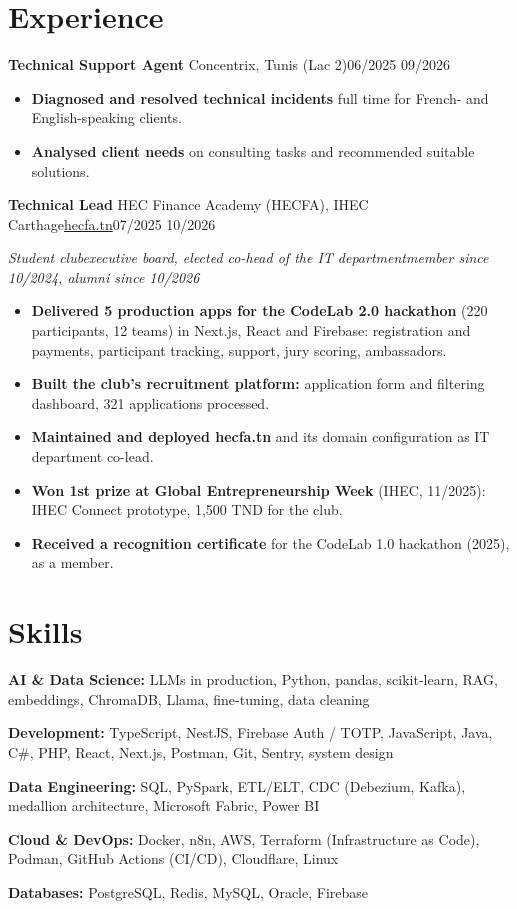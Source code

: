 \documentclass[10pt]{article}
\newcommand{\entry}[3]{\par\vspace{2pt}\textbf{#1}#2\hfill{\color{soft}#3}\par}
\newcommand{\sub}[1]{{\itshape\color{soft}#1\par}}
\newcommand{\sep}{\enspace\textperiodcentered\enspace}
\begin{document}
\section{Experience}
\entry{Technical Support Agent}{ \textendash{} Concentrix, Tunis (Lac 2)}{06/2025 \textendash{} 09/2026}
\begin{itemize}
\item \textbf{Diagnosed and resolved technical incidents} full time for French- and English-speaking clients.
\item \textbf{Analysed client needs} on consulting tasks and recommended suitable solutions.
\end{itemize}
\entry{Technical Lead}{ \textendash{} HEC Finance Academy (HECFA), IHEC Carthage\sep \href{https://hecfa.tn}{hecfa.tn}}{07/2025 \textendash{} 10/2026}
\sub{Student club\sep executive board, elected co-head of the IT department\sep member since 10/2024, alumni since 10/2026}
\begin{itemize}
\item \textbf{Delivered 5 production apps for the CodeLab 2.0 hackathon} (220 participants, 12 teams) in Next.js, React and Firebase: registration and payments, participant tracking, support, jury scoring, ambassadors.
\item \textbf{Built the club's recruitment platform:} application form and filtering dashboard, 321 applications processed.
\item \textbf{Maintained and deployed hecfa.tn} and its domain configuration as IT department co-lead.
\item \textbf{Won 1st prize at Global Entrepreneurship Week} (IHEC, 11/2025): IHEC Connect prototype, 1,500 TND for the club.
\item \textbf{Received a recognition certificate} for the CodeLab 1.0 hackathon (2025), as a member.
\end{itemize}
\section{Skills}
\textbf{AI \& Data Science:} LLMs in production, Python, pandas, scikit-learn, RAG, embeddings, ChromaDB, Llama, fine-tuning, data cleaning\par
\textbf{Development:} TypeScript, NestJS, Firebase Auth / TOTP, JavaScript, Java, C\#, PHP, React, Next.js, Postman, Git, Sentry, system design\par
\textbf{Data Engineering:} SQL, PySpark, ETL/ELT, CDC (Debezium, Kafka), medallion architecture, Microsoft Fabric, Power BI\par
\textbf{Cloud \& DevOps:} Docker, n8n, AWS, Terraform (Infrastructure as Code), Podman, GitHub Actions (CI/CD), Cloudflare, Linux\par
\textbf{Databases:} PostgreSQL, Redis, MySQL, Oracle, Firebase\par
\end{document}
